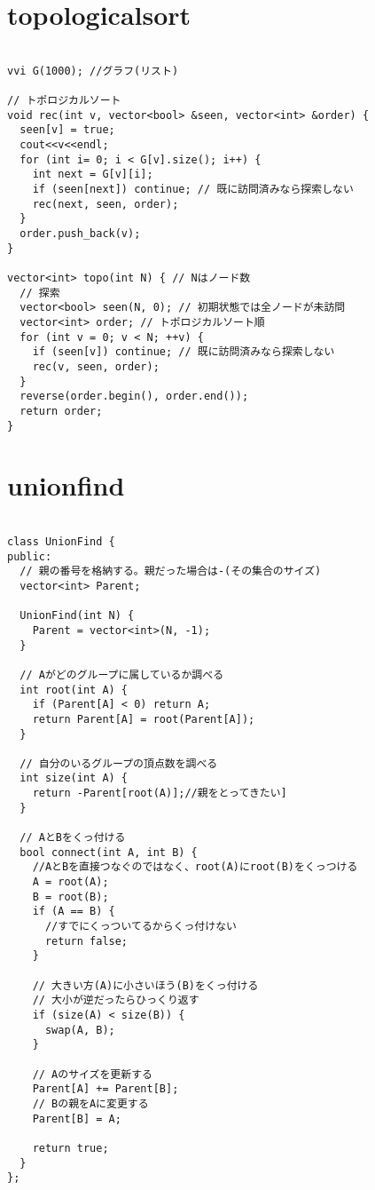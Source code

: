 \documentclass[a4j,titlepage]{jarticle} %
\begin{document}
\color{white}
\section{topologicalsort}
\color{black}
\begin{lstlisting}[caption=topologicalsort]

vvi G(1000); //グラフ(リスト)

// トポロジカルソート
void rec(int v, vector<bool> &seen, vector<int> &order) {
  seen[v] = true;
  cout<<v<<endl;
  for (int i= 0; i < G[v].size(); i++) {
    int next = G[v][i];
    if (seen[next]) continue; // 既に訪問済みなら探索しない
    rec(next, seen, order);
  }
  order.push_back(v);
}

vector<int> topo(int N) { // Nはノード数
  // 探索
  vector<bool> seen(N, 0); // 初期状態では全ノードが未訪問
  vector<int> order; // トポロジカルソート順
  for (int v = 0; v < N; ++v) {
    if (seen[v]) continue; // 既に訪問済みなら探索しない
    rec(v, seen, order);
  }
  reverse(order.begin(), order.end());
  return order;
}

\end{lstlisting}

\color{white}
\section{unionfind}
\color{black}
\begin{lstlisting}[caption=unionfind]

class UnionFind {
public:
  // 親の番号を格納する。親だった場合は-(その集合のサイズ)
  vector<int> Parent;

  UnionFind(int N) {
    Parent = vector<int>(N, -1);
  }

  // Aがどのグループに属しているか調べる
  int root(int A) {
    if (Parent[A] < 0) return A;
    return Parent[A] = root(Parent[A]);
  }

  // 自分のいるグループの頂点数を調べる
  int size(int A) {
    return -Parent[root(A)];//親をとってきたい]
  }

  // AとBをくっ付ける
  bool connect(int A, int B) {
    //AとBを直接つなぐのではなく、root(A)にroot(B)をくっつける
    A = root(A);
    B = root(B);
    if (A == B) {
      //すでにくっついてるからくっ付けない
      return false;
    }

    // 大きい方(A)に小さいほう(B)をくっ付ける
    // 大小が逆だったらひっくり返す
    if (size(A) < size(B)) {
      swap(A, B);
    }

    // Aのサイズを更新する
    Parent[A] += Parent[B];
    // Bの親をAに変更する
    Parent[B] = A;

    return true;
  }
};

\end{lstlisting}
\end{document}
